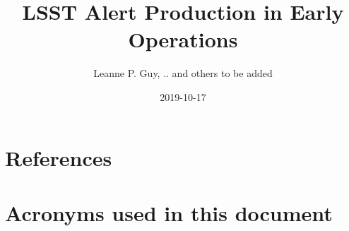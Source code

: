 \documentclass[SE,toc, lsstdraft]{lsstdoc}
\title[LOY1 Alerts]{LSST Alert Production in Early Operations}
\author{%
Leanne P. Guy, .. and others to be added
}
\date{2019-10-17}
\begin{document}
\maketitle




\appendix
\section{References}
\label{sec:refs}


\section{Acronyms used in this document}\label{sec:acronyms}
\label{sec:acronyms}


\printglossaries
\end{document}
